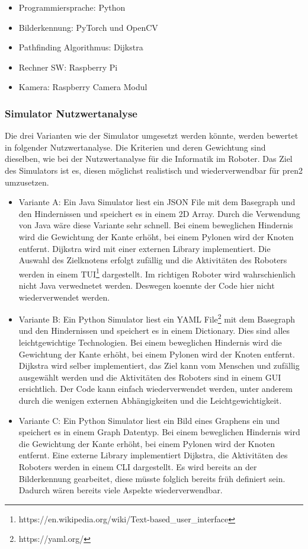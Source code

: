 \begin{itemize}
    \item Programmiersprache: Python
    \item Bilderkennung: PyTorch und OpenCV
    \item Pathfinding Algorithmus: Dijkstra
    \item Rechner SW: Raspberry Pi
    \item Kamera: Raspberry Camera Modul
\end{itemize}

\subsubsection{Simulator Nutzwertanalyse}

Die drei Varianten wie der Simulator umgesetzt werden könnte, werden bewertet in folgender Nutzwertanalyse. Die Kriterien und deren Gewichtung sind dieselben, wie bei der Nutzwertanalyse für die Informatik im Roboter. Das Ziel des Simulators ist es, diesen möglichst realistisch und wiederverwendbar für \acrshort{pren2} umzusetzen.

\begin{itemize}
    \item Variante A: Ein Java Simulator liest ein JSON File mit dem Basegraph und den Hindernissen und speichert es in einem 2D Array. Durch die Verwendung von Java wäre diese Variante sehr schnell. Bei einem beweglichen Hindernis wird die Gewichtung der Kante erhöht, bei einem Pylonen wird der Knoten entfernt. Dijkstra wird mit einer externen Library implementiert. Die Auswahl des Zielknotens erfolgt zufällig und die Aktivitäten des Roboters werden in einem TUI\footnote{https://en.wikipedia.org/wiki/Text-based\_user\_interface} dargestellt. Im richtigen Roboter wird wahrschienlich nicht Java verwednetet werden. Deswegen koennte der Code hier nicht wiederverwendet werden.
    \item Variante B: Ein Python Simulator liest ein YAML File\footnote{https://yaml.org/} mit dem Basegraph und den Hindernissen und speichert es in einem Dictionary. Dies sind alles leichtgewichtige Technologien. Bei einem beweglichen Hindernis wird die Gewichtung der Kante erhöht, bei einem Pylonen wird der Knoten entfernt. Dijkstra wird selber implementiert, das Ziel kann vom Menschen und zufällig ausgewählt werden und die Aktivitäten des Roboters sind in einem GUI ersichtlich. Der Code kann einfach wiederverwendet werden, unter anderem durch die wenigen externen Abhängigkeiten und die Leichtgewichtigkeit. 
    \item Variante C: Ein Python Simulator liest ein Bild eines Graphens ein und speichert es in einem Graph Datentyp. Bei einem beweglichen Hindernis wird die Gewichtung der Kante erhöht, bei einem Pylonen wird der Knoten entfernt. Eine externe Library implementiert Dijkstra, die Aktivitäten des Roboters werden in einem CLI dargestellt. Es wird bereits an der Bilderkennung gearbeitet, diese müsste folglich bereits früh definiert sein. Dadurch wären bereits viele Aspekte wiederverwendbar.
\end{itemize}

